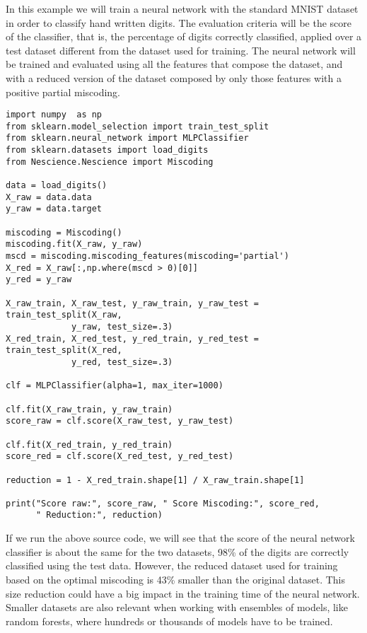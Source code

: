 \begin{example}
In this example we will train a neural network with the standard MNIST dataset in order to classify hand written digits. The evaluation criteria will be the score of the classifier, that is, the percentage of digits correctly classified, applied over a test dataset different from the dataset used for training. The neural network will be trained and evaluated using all the features that compose the dataset, and with a reduced version of the dataset composed by only those features with a positive partial miscoding.

\begin{sourcecode}
{\scriptsize \begin{verbatim}
import numpy  as np
from sklearn.model_selection import train_test_split
from sklearn.neural_network import MLPClassifier
from sklearn.datasets import load_digits
from Nescience.Nescience import Miscoding

data = load_digits()
X_raw = data.data
y_raw = data.target

miscoding = Miscoding()
miscoding.fit(X_raw, y_raw)
mscd = miscoding.miscoding_features(miscoding='partial')
X_red = X_raw[:,np.where(mscd > 0)[0]]
y_red = y_raw

X_raw_train, X_raw_test, y_raw_train, y_raw_test = train_test_split(X_raw,
             y_raw, test_size=.3)
X_red_train, X_red_test, y_red_train, y_red_test = train_test_split(X_red,
             y_red, test_size=.3)

clf = MLPClassifier(alpha=1, max_iter=1000)

clf.fit(X_raw_train, y_raw_train)
score_raw = clf.score(X_raw_test, y_raw_test)
        
clf.fit(X_red_train, y_red_train)
score_red = clf.score(X_red_test, y_red_test)
        
reduction = 1 - X_red_train.shape[1] / X_raw_train.shape[1]

print("Score raw:", score_raw, " Score Miscoding:", score_red,
      " Reduction:", reduction)
\end{verbatim}}
\end{sourcecode}

If we run the above source code, we will see that the score of the neural network classifier is about the same for the two datasets, 98\% of the digits are correctly classified using the test data. However, the reduced dataset used for training based on the optimal miscoding is 43\% smaller than the original dataset. This size reduction could have a big impact in the training time of the neural network. Smaller datasets are also relevant when working with ensembles of models, like random forests, where hundreds or thousands of models have to be trained.

\end{example}

